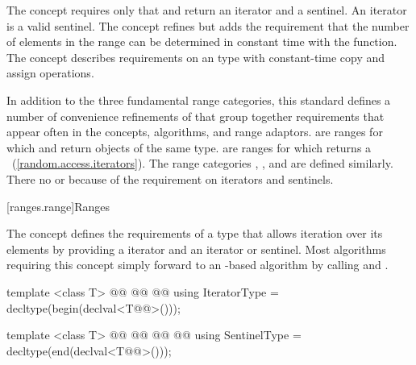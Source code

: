 \begin{addedblock}
\pnum
The  concept requires only that  and 
return an iterator and a sentinel. \enternote An iterator is a valid sentinel.
\exitnote The  concept refines  but adds
the requirement that the number of elements in the range can be determined
in constant time with the  function. The  concept describes
requirements on an  type with constant-time copy and assign
operations.

\pnum
In addition to the three fundamental range categories, this standard defines
a number of convenience refinements of  that group together requirements
that appear often in the concepts, algorithms, and range adaptors.
 are ranges for which  and  return objects of the
same type.  are ranges for which
 returns a 
~(\ref{random.access.iterators}). The range
categories ,
,
 and
 are defined similarly.
\enternote There  no  or
 because of the 
requirement on iterators and sentinels. \exitnote {}

[ranges.range]{Ranges}

\pnum
The  concept defines the requirements of a type that allows
iteration over its elements by providing a  iterator and an
 iterator or sentinel.
\enternote Most algorithms requiring this concept simply forward to an
-based algorithm by calling  and . \exitnote

\begin{itemdecl}
template <class T>
  @@
    @@
  @\newtxt{\}}@
using IteratorType = decltype(begin(declval<T@\newtxt{\&}@>()));

template <class T>
  @@
    @@
    @@
  @\newtxt{\}}@
using SentinelType = decltype(end(declval<T@\newtxt{\&}@>()));


\end{itemdecl}
\end{addedblock}
